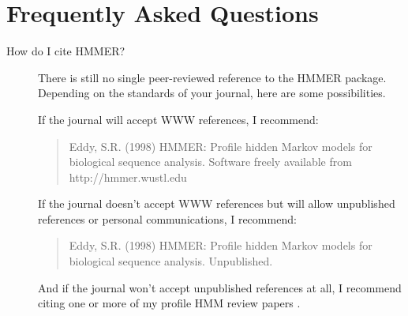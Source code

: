 
\chapter{Frequently Asked Questions}

\begin{description}
\item
[How do I cite HMMER?]
There is still no single peer-reviewed reference to the HMMER
package. Depending on the standards of your journal, here are
some possibilities.

If the journal will accept WWW references, I recommend:

\begin{quote}
Eddy, S.R. (1998) HMMER: Profile hidden Markov models for
biological sequence analysis. Software freely available from
http://hmmer.wustl.edu
\end{quote}

If the journal doesn't accept WWW references but will allow
unpublished references or personal communications, I recommend:

\begin{quote}
Eddy, S.R. (1998) HMMER: Profile hidden Markov models for
biological sequence analysis. Unpublished.
\end{quote}

And if the journal won't accept unpublished references at all, I
recommend citing one or more of my profile HMM review papers
\cite{Eddy96,Eddy98}.

\end{description}
